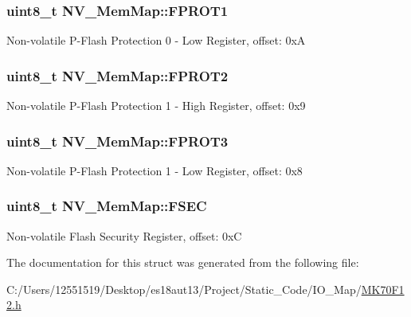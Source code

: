 \subsubsection[{F\+P\+R\+O\+T1}]{\setlength{\rightskip}{0pt plus 5cm}uint8\+\_\+t N\+V\+\_\+\+Mem\+Map\+::\+F\+P\+R\+O\+T1}\label{struct_n_v___mem_map_a87204afdff32b371c03caafdf5a07b69}
Non-\/volatile P-\/\+Flash Protection 0 -\/ Low Register, offset\+: 0x\+A \hypertarget{struct_n_v___mem_map_aace11e44cee29095fe7c0bf683039f57}{}
\subsubsection[{F\+P\+R\+O\+T2}]{\setlength{\rightskip}{0pt plus 5cm}uint8\+\_\+t N\+V\+\_\+\+Mem\+Map\+::\+F\+P\+R\+O\+T2}\label{struct_n_v___mem_map_aace11e44cee29095fe7c0bf683039f57}
Non-\/volatile P-\/\+Flash Protection 1 -\/ High Register, offset\+: 0x9 \hypertarget{struct_n_v___mem_map_a944089b14b23cff0b4f8a16e13f8b9d6}{}
\subsubsection[{F\+P\+R\+O\+T3}]{\setlength{\rightskip}{0pt plus 5cm}uint8\+\_\+t N\+V\+\_\+\+Mem\+Map\+::\+F\+P\+R\+O\+T3}\label{struct_n_v___mem_map_a944089b14b23cff0b4f8a16e13f8b9d6}
Non-\/volatile P-\/\+Flash Protection 1 -\/ Low Register, offset\+: 0x8 \hypertarget{struct_n_v___mem_map_acb89fbc884fb10887ef063d1aa892b29}{}
\subsubsection[{F\+S\+E\+C}]{\setlength{\rightskip}{0pt plus 5cm}uint8\+\_\+t N\+V\+\_\+\+Mem\+Map\+::\+F\+S\+E\+C}\label{struct_n_v___mem_map_acb89fbc884fb10887ef063d1aa892b29}
Non-\/volatile Flash Security Register, offset\+: 0x\+C 

The documentation for this struct was generated from the following file\+:\begin{DoxyCompactItemize}
\item 
C\+:/\+Users/12551519/\+Desktop/es18aut13/\+Project/\+Static\+\_\+\+Code/\+I\+O\+\_\+\+Map/\hyperlink{_m_k70_f12_8h}{M\+K70\+F12.\+h}\end{DoxyCompactItemize}
